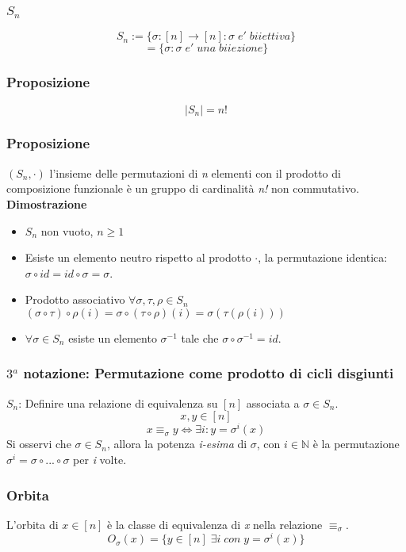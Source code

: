 \subsubsection{\(S_n\)}
\[S_n:=\{\sigma : [n]\rightarrow[n] : \sigma\;e'\;biiettiva\}\]
\[=\{\sigma : \sigma\;e'\;una\;biiezione\}\]

\subsubsection{Proposizione}
\[|S_n|=n!\]

\subsubsection{Proposizione}
\((S_n,\cdot)\) l'insieme delle permutazioni di \textit{n} elementi con il prodotto di composizione funzionale è un gruppo di cardinalità \textit{n!} non commutativo.
\\
\textbf{Dimostrazione}
\begin{itemize}
    \item \(S_n\) non vuoto, \(n\geq 1\)
    
    \item Esiste un elemento neutro rispetto al prodotto \(\cdot\), la permutazione identica: \(\sigma\circ id=id\circ\sigma=\sigma\).
    
    \item Prodotto associativo \(\forall\sigma ,\tau ,\rho\in S_n\) \((\sigma\circ \tau )\circ\rho (i)=\sigma\circ (\tau\circ\rho )(i)=\sigma ( \tau (\rho (i)))\)
    
    \item \(\forall\sigma\in S_n\) esiste un elemento \(\sigma ^{-1}\) tale che \(\sigma\circ\sigma ^{-1}=id\).
\end{itemize}

\subsubsection{\(3^a\) notazione: Permutazione come prodotto di cicli disgiunti}
\(S_n\): Definire una relazione di equivalenza su \([n]\) associata a \(\sigma \in S_n\).
\[x,y\in [n]\]
\[x\equiv _\sigma y\Leftrightarrow \exists i : y=\sigma ^i(x)\]
Si osservi che \(\sigma\in S_n\), allora la potenza \textit{i-esima} di \(\sigma\), con \(i\in\mathbb{N}\) è la permutazione \(\sigma ^i =\sigma\circ ...\circ\sigma\) per \textit{i} volte.

 \subsubsection{Orbita} L'orbita di \(x\in [n]\) è la classe di equivalenza di \textit{x} nella relazione \(\equiv _\sigma\). \[O_\sigma (x) =\{y\in [n]\;\exists i\;con\;y=\sigma ^i(x)\}\]


